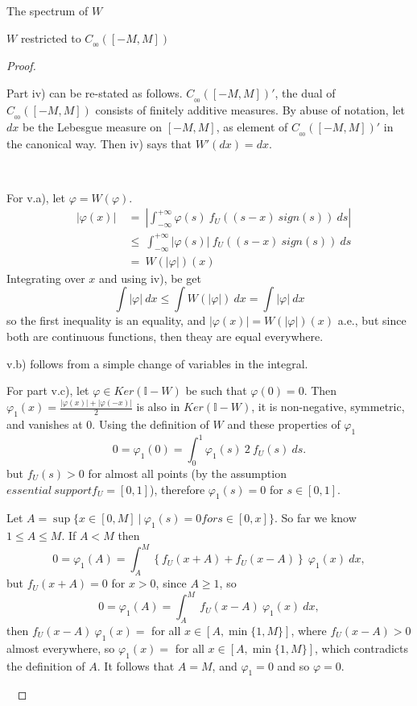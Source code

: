 \documentclass[12pt]{article}
\begin{document}
\begin{section}{The spectrum of $W$ }
\begin{subsection}{$W$ restricted to $C_{_{0\!0}}([-M,M])$}
\begin{proof}
	\    


	Part iv) can be re-stated as follows. $C_{_{00}}([-M,M])'$, the dual 
	of $C_{_{00}}([-M,M])$ consists of finitely additive measures. By abuse of notation, let $dx$ be the Lebesgue measure on $[-M,M]$, as element of $C_{_{00}}([-M,M])'$ in the canonical way. Then iv) says that $W'(dx) = dx$.  
	\  
	
	\   

	For v.a), let $\varphi = W(\varphi)$. 
	\begin{align*}
&&	|\varphi(x)| &~=~ \left| \int_{-\infty}^{+\infty} \varphi(s)\ f_U\!\left(  \left(s - x \right)\ sign(s) \right) \ ds \right| &\\
&&	&~\le~ 
	  \int_{-\infty}^{+\infty} \left| \varphi(s) \right| \ f_U\!\left(  \left(s - x \right)\ sign(s) \right) \ ds  & \\
&& &~=~ W(|\varphi|)(x)  &
	\end{align*}
Integrating over $x$ and using iv), be get
$$
\int |\varphi| \ dx \le \int W(|\varphi|) \ dx = \int |\varphi| \ dx 
$$	
so the first inequality is an equality, and $|\varphi(x)| = W(|\varphi|)(x)$ a.e., but since both are continuous functions, then theay are equal everywhere.
	\  
\  
  
v.b) follows from a simple change of variables in the integral. 

For part v.c), let $\varphi \in Ker(\mathbb{I} - W)$ be such that $\varphi(0)=0$. Then $\varphi_1(x) = \frac{|\varphi(x)| + |\varphi(-x)|}{2}$ is also in  $Ker(\mathbb{I} - W)$, it is non-negative, symmetric, and vanishes at $0$. Using the definition of $W$ and these properties of $\varphi_1$
$$
0 = \varphi_1(0) = \int_{0}^{1} \varphi_1(s)\ 2 \ f_U\!( s) \ ds.
$$
but $f_U(s)>0$ for almost all points (by the assumption $essential \ support f_U = [0,1]$), therefore $\varphi_1(s)=0$ for $s \in [0,1]$.

Let $A=\sup\{ x \in [0,M]\ | \ \varphi_1(s)=0 for s \in [0,x]\}$. So far we know $1 \le A \le M$. If $A < M$ then 
$$
0 = \varphi_1(A) = \int_{A}^M \left\{ f_U(x+A) + f_U(x-A) \right\} \ \varphi_1(x) \ dx, 
$$
but $f_U(x+A)=0$ for $x>0$, since $A \ge 1$, so
$$
0 = \varphi_1(A) = \int_{A}^M \ f_U(x-A) \ \varphi_1(x) \ dx, 
$$
then $f_U(x-A) \ \varphi_1(x) = $ for all $x \in [A, \min\{1,M\}]$, where  $f_U(x-A) > 0$ almost everywhere, so $\varphi_1(x) = $ for all $x \in [A, \min\{1,M\}]$, which contradicts the definition of $A$. It follows that $A=M$, and $\varphi_1 = 0$ and so $\varphi = 0$.

\  


\end{proof}
\end{subsection}
\end{section}
\end{document}
